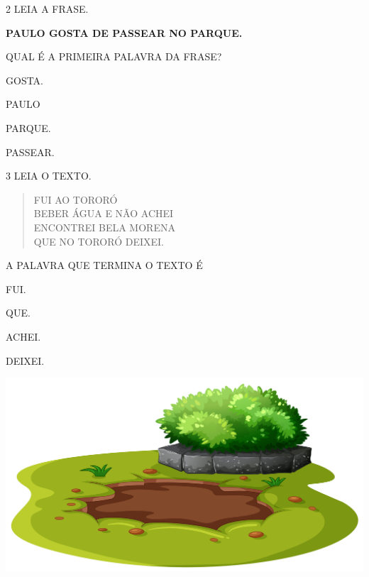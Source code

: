 \num{2} LEIA A FRASE.

\begin{myquote}
\textbf{PAULO GOSTA DE PASSEAR NO PARQUE.}
\end{myquote}

QUAL É A PRIMEIRA PALAVRA DA FRASE?

\begin{multicols}{2}
\begin{escolha}%
\item GOSTA.

\item PAULO

\item PARQUE.

\item PASSEAR.
\end{escolha}
\end{multicols}


\num{3} LEIA O TEXTO.

\begin{myquote}
\begin{verse}
FUI AO TORORÓ\\
BEBER ÁGUA E NÃO ACHEI\\
ENCONTREI BELA MORENA\\
QUE NO TORORÓ DEIXEI.
\end{verse}

\end{myquote}

A PALAVRA QUE TERMINA O TEXTO É

\begin{minipage}{.5\textwidth}
\begin{escolha}
\item FUI.

\item QUE.

\item ACHEI.

\item DEIXEI.
\end{escolha}
\end{minipage}
\hspace{.5cm}
\begin{minipage}{.5\textwidth}
\includegraphics[width=\textwidth]{media/image262.png}
\end{minipage}	

